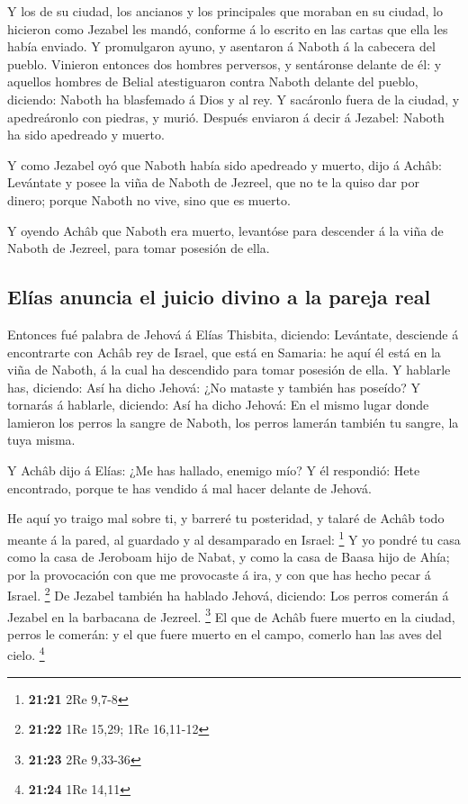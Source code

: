  Y los de su ciudad, los ancianos y los principales que
moraban en su ciudad, lo hicieron como Jezabel les mandó, conforme á lo
escrito en las cartas que ella les había enviado.  Y
promulgaron ayuno, y asentaron á Naboth á la cabecera del pueblo.
 Vinieron entonces dos hombres perversos, y sentáronse
delante de él: y aquellos hombres de Belial atestiguaron contra Naboth
delante del pueblo, diciendo: Naboth ha blasfemado á Dios y al rey. Y
sacáronlo fuera de la ciudad, y apedreáronlo con piedras, y murió.
 Después enviaron á decir á Jezabel: Naboth ha sido
apedreado y muerto.

 Y como Jezabel oyó que Naboth había sido apedreado y
muerto, dijo á Achâb: Levántate y posee la viña de Naboth de Jezreel,
que no te la quiso dar por dinero; porque Naboth no vive, sino que es
muerto.

 Y oyendo Achâb que Naboth era muerto, levantóse para
descender á la viña de Naboth de Jezreel, para tomar posesión de ella.

\hypertarget{eluxedas-anuncia-el-juicio-divino-a-la-pareja-real}{%
\subsection{Elías anuncia el juicio divino a la pareja
real}\label{eluxedas-anuncia-el-juicio-divino-a-la-pareja-real}}

 Entonces fué palabra de Jehová á Elías Thisbita, diciendo:
 Levántate, desciende á encontrarte con Achâb rey de
Israel, que está en Samaria: he aquí él está en la viña de Naboth, á la
cual ha descendido para tomar posesión de ella.  Y hablarle
has, diciendo: Así ha dicho Jehová: ¿No mataste y también has poseído? Y
tornarás á hablarle, diciendo: Así ha dicho Jehová: En el mismo lugar
donde lamieron los perros la sangre de Naboth, los perros lamerán
también tu sangre, la tuya misma.

 Y Achâb dijo á Elías: ¿Me has hallado, enemigo mío? Y él
respondió: Hete encontrado, porque te has vendido á mal hacer delante de
Jehová.

 He aquí yo traigo mal sobre ti, y barreré tu posteridad, y
talaré de Achâb todo meante á la pared, al guardado y al desamparado en
Israel: \footnote{\textbf{21:21} 2Re 9,7-8}  Y yo pondré tu
casa como la casa de Jeroboam hijo de Nabat, y como la casa de Baasa
hijo de Ahía; por la provocación con que me provocaste á ira, y con que
has hecho pecar á Israel. \footnote{\textbf{21:22} 1Re 15,29; 1Re
  16,11-12}  De Jezabel también ha hablado Jehová,
diciendo: Los perros comerán á Jezabel en la barbacana de Jezreel.
\footnote{\textbf{21:23} 2Re 9,33-36}  El que de Achâb
fuere muerto en la ciudad, perros le comerán: y el que fuere muerto en
el campo, comerlo han las aves del cielo. \footnote{\textbf{21:24} 1Re
  14,11}

